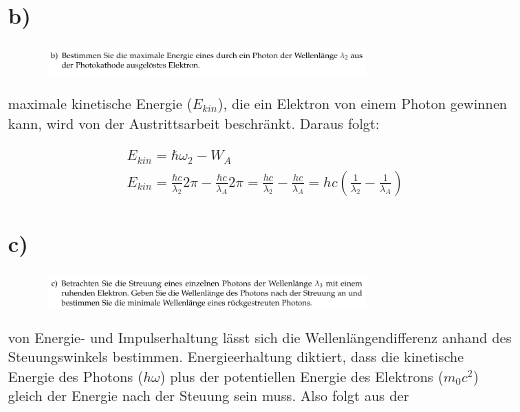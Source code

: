 \subsection{b)}

\begin{figure}[H]
    \centering
    \includegraphics[width=0.75\textwidth]{images/Aufgabe_3b.jpg}
    \label{fig:9}
\end{figure}

    \justifying maximale kinetische Energie ($E_{kin}$), die ein Elektron von einem Photon gewinnen kann, wird von der Austrittsarbeit beschränkt. 
    Daraus folgt:

    \begin{align}
        &E_{kin} = \hbar \omega_2 - W_A\\
        &E_{kin} = \frac{\hbar c}{\lambda_2} 2\pi - \frac{\hbar c}{\lambda_A} 2\pi = 
        \frac{h c}{\lambda_2} - \frac{h c}{\lambda_A} = h c \left ( \frac{1}{\lambda_2} - \frac{1}{\lambda_A} \right )
    \end{align}

\subsection{c)}

\begin{figure}[H]
    \centering
    \includegraphics[width=0.75\textwidth]{images/Aufgabe_3c.jpg}
    \label{fig:10}
\end{figure}

    \justifying von Energie- und Impulserhaltung lässt sich die Wellenlängendifferenz anhand des Steuungswinkels bestimmen.
    Energieerhaltung diktiert, dass die kinetische Energie des Photons ($h \omega$) plus der potentiellen Energie des Elektrons ($m_0 c^2$)
    gleich der Energie nach der Steuung sein muss. 
    Also folgt aus der

